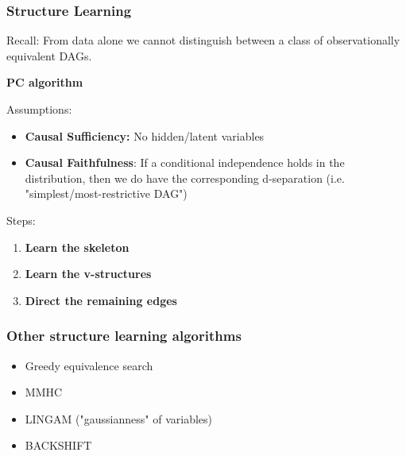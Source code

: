 \documentclass{beamer}
\begin{document}
\begin{frame}
\frametitle{Structure Learning}
Recall: From data alone we cannot distinguish between a class of observationally equivalent DAGs.

\textbf{PC algorithm}

Assumptions:
\begin{itemize}
	\item \textbf{Causal Sufficiency:} No hidden/latent variables
	\item \textbf{Causal Faithfulness}: If a conditional independence holds in the distribution, then we do have the corresponding d-separation (i.e. "simplest/most-restrictive DAG")
\end{itemize}

Steps:
\begin{enumerate}
	\item \textbf{Learn the skeleton}
	\item \textbf{Learn the v-structures}
	\item \textbf{Direct the remaining edges}
\end{enumerate}
\end{frame}

\begin{frame}
\frametitle{Other structure learning algorithms}
\begin{itemize}
	\item Greedy equivalence search
	\item MMHC
	\item LINGAM ("gaussianness" of variables)
	\item BACKSHIFT
\end{itemize}

\end{frame}



\end{document}
